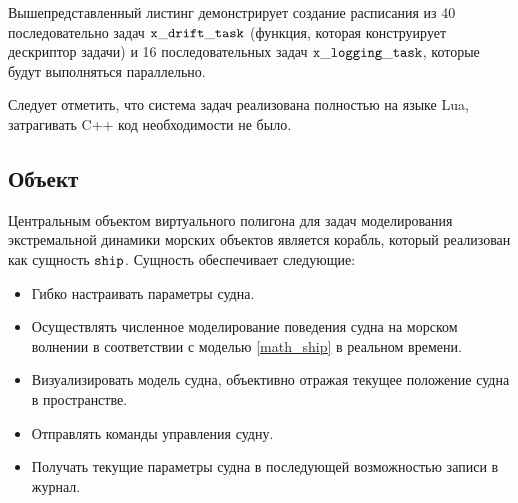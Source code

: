 Вышепредставленный листинг демонстрирует создание расписания из 40 последовательно задач $\tt x\_drift\_task$ (функция, которая конструирует дескриптор задачи) и 16 последовательных задач 
$\tt x\_logging\_task$, которые будут выполняться параллельно.

Следует отметить, что система задач реализована полностью на языке Lua, затрагивать C++ код необходимости не было.

%

\subsection{Объект }

Центральным объектом виртуального полигона для задач моделирования экстремальной динамики морских объектов является корабль, который реализован как сущность $\tt ship$. 
Сущность обеспечивает следующие:
\begin{itemize}
	\item	Гибко настраивать параметры судна.
	\item	Осуществлять численное моделирование поведения судна на морском волнении 
			в соответствии с моделью \ref{math_ship} в реальном времени.
	\item 	Визуализировать модель судна, объективно отражая текущее положение судна в пространстве.
	\item	Отправлять команды управления судну.
	\item	Получать текущие параметры судна в последующей возможностью записи в журнал.
\end{itemize}


